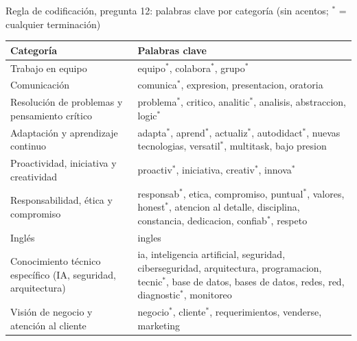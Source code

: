 \begin{mitabla}{Regla de codificación, pregunta 12: palabras clave por categoría (sin acentos; $^{*}$ = cualquier terminación)}
\begin{tabular}{L{5.2cm}L{9.4cm}}
\toprule
Categoría & Palabras clave \\
\midrule
Trabajo en equipo & equipo$^{*}$, colabora$^{*}$, grupo$^{*}$ \\
Comunicación & comunica$^{*}$, expresion, presentacion, oratoria \\
Resolución de problemas y pensamiento crítico & problema$^{*}$, critico, analitic$^{*}$, analisis, abstraccion, logic$^{*}$ \\
Adaptación y aprendizaje continuo & adapta$^{*}$, aprend$^{*}$, actualiz$^{*}$, autodidact$^{*}$, nuevas tecnologias, versatil$^{*}$, multitask, bajo presion \\
Proactividad, iniciativa y creatividad & proactiv$^{*}$, iniciativa, creativ$^{*}$, innova$^{*}$ \\
Responsabilidad, ética y compromiso & responsab$^{*}$, etica, compromiso, puntual$^{*}$, valores, honest$^{*}$, atencion al detalle, disciplina, constancia, dedicacion, confiab$^{*}$, respeto \\
Inglés & ingles \\
Conocimiento técnico específico (IA, seguridad, arquitectura) & ia, inteligencia artificial, seguridad, ciberseguridad, arquitectura, programacion, tecnic$^{*}$, base de datos, bases de datos, redes, red, diagnostic$^{*}$, monitoreo \\
Visión de negocio y atención al cliente & negocio$^{*}$, cliente$^{*}$, requerimientos, venderse, marketing \\
\bottomrule
\end{tabular}
\end{mitabla}

